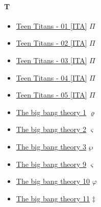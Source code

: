 	\paragraph{T} \hypertarget{ST}{}
		\begin{itemize}
			
			\item \href{https://mega.nz/#F!UaZliJJA!7ynL_vV_BFCeVzkTkF7JFQ} {Teen Titans - 01 [ITA]}  $\varPi$ \\ 
			\item \href{https://mega.nz/#F!tbQVDJSB!3Z7Ef6qN7EqxaUn1Fuh3pA} {Teen Titans - 02 [ITA]}  $\varPi$ \\ 
			\item \href{https://mega.nz/#F!ge53DZpb!wB1MHwnyddsBUntj2KVTiw} {Teen Titans - 03 [ITA]}  $\varPi$ \\ 
			\item \href{https://mega.nz/#F!1eYTwaIA!Y4HSZIJ9GtGRzP6ziarPeQ} {Teen Titans - 04 [ITA]}  $\varPi$ \\ 
			\item \href{https://mega.nz/#F!sT43yDRK!OraIYXK5Mc5wXkpi2zuKLw} {Teen Titans - 05 [ITA]}  $\varPi$ \\
			\item \href{https://mega.nz/#F!1ep2BCaa!Sw0XXl98xrJSqabkA1Ngyw} {The big bang theory 1}  $\varrho$ \\ 
			\item \href{https://mega.nz/#F!YyZEXDAT!igZeVPR-3wAygnhQoEg9tw} {The big bang theory 2}  $\varsigma$ \\
			\item \href{https://mega.nz/#F!ieoGTCKb!wRdLXIOmvfGq5M61MUVypg} {The big bang theory 3}  $\wp$ \\ 
			\item \href{https://mega.nz/#F!wqo0XBSL!TJG9Srjn3vdQCi_Xmygz2g} {The big bang theory 9}  $\varsigma$ \\ 
			\item \href{https://mega.nz/#F!NSZwSIZQ!IlVfCOnKXIh5_t_Fwr-QGQ} {The big bang theory 10}  $\varphi$ \\ 
			\item \href{https://mega.nz/#F!biJxwSbb!cth-Hs9ubhBDXlJ-EnIyAQ} {The big bang theory 11}  $\ddag$ \\ 
			
		\end{itemize}
	
